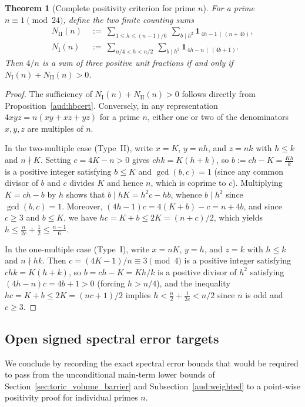 \documentclass[11pt, a4paper]{article}
\theoremstyle{plain}
\newtheorem{theorem}{Theorem}[section]
\theoremstyle{definition}
\newcommand{\ind}{\mathbf{1}}
\newcommand{\I}{\mathrm{I}}
\newcommand{\II}{\mathrm{II}}
\begin{document}
\begin{theorem}[Complete positivity criterion for prime $n$]\label{aud:hbcomplete}
For a prime $n\equiv1\pmod{24}$, define the two finite counting sums
\begin{align}
N_{\II}(n)\ &:=\ \sum_{1\le h\le(n-1)/6}\ \sum_{b\mid h^{2}}\ind_{\,4h-1\,\mid\,(n+4b)},\label{aud:NII}\\
N_{\I}(n)\ &:=\ \sum_{n/4<h<n/2}\ \sum_{b\mid h^{2}}\ind_{\,4h-n\,\mid\,(4b+1)}.\label{aud:NI}
\end{align}
Then $4/n$ is a sum of three positive unit fractions if and only if $N_{\I}(n)+N_{\II}(n)>0$.
\end{theorem}
\begin{proof}
The sufficiency of $N_{\I}(n)+N_{\II}(n)>0$ follows directly from Proposition~\ref{aud:hbcert}. Conversely, in any representation $4xyz=n(xy+xz+yz)$ for a prime $n$, either one or two of the denominators $x,y,z$ are multiples of $n$.

In the two-multiple case (Type~II), write $x=K$, $y=nh$, and $z=nk$ with $h\le k$ and $n\nmid K$. Setting $c=4K-n>0$ gives $chk=K(h+k)$, so $b:=ch-K=\frac{Kh}{k}$ is a positive integer satisfying $b\le K$ and $\gcd(b,c)=1$ (since any common divisor of $b$ and $c$ divides $K$ and hence $n$, which is coprime to $c$). Multiplying $K=ch-b$ by $h$ shows that $b\mid hK=h^{2}c-hb$, whence $b\mid h^{2}$ since $\gcd(b,c)=1$. Moreover, $(4h-1)c=4(K+b)-c=n+4b$, and since $c\ge 3$ and $b\le K$, we have $hc=K+b\le 2K=(n+c)/2$, which yields $h\le\frac{n}{2c}+\frac12\le\frac{n-1}{6}$.

In the one-multiple case (Type~I), write $x=nK$, $y=h$, and $z=k$ with $h\le k$ and $n\nmid hk$. Then $c=(4K-1)/n\equiv3\pmod 4$ is a positive integer satisfying $chk=K(h+k)$, so $b=ch-K=Kh/k$ is a positive divisor of $h^{2}$ satisfying $(4h-n)c=4b+1>0$ (forcing $h>n/4$), and the inequality $hc=K+b\le 2K=(nc+1)/2$ implies $h<\frac{n}{2}+\frac{1}{2c}<n/2$ since $n$ is odd and $c\ge 3$.
\end{proof}

\subsection{Open signed spectral error targets}\label{aud:open}

We conclude by recording the exact spectral error bounds that would be required to pass from the unconditional main-term lower bounds of Section~\ref{sec:toric_volume_barrier} and Subsection~\ref{aud:weighted} to a point-wise positivity proof for individual primes $n$.
\end{document}
